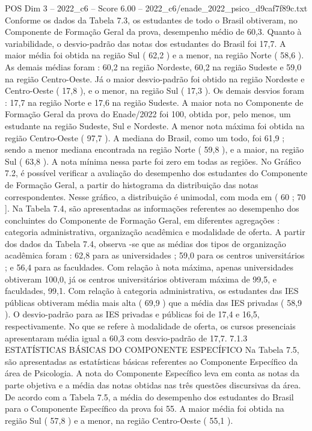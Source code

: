 \begin{textsample}{POS Dim 3 – 2022\_c6 – Score 6.00 – 2022\_c6/enade\_2022\_psico\_d9caf7f89c.txt}
Conforme os dados da Tabela 7.3, os estudantes de todo o Brasil obtiveram, no Componente de Formação Geral da prova, desempenho médio de 60,3.
Quanto à variabilidade, o desvio-padrão das notas dos estudantes do Brasil foi 17,7.
A maior média foi obtida na região Sul ( 62,2 ) e a menor, na região Norte ( 58,6 ).
As demais médias foram : 60,2 na região Nordeste, 60,2 na região Sudeste e 59,0 na região Centro-Oeste.
Já o maior desvio-padrão foi obtido na região Nordeste e Centro-Oeste ( 17,8 ), e o menor, na região Sul ( 17,3 ).
Os demais desvios foram : 17,7 na região Norte e 17,6 na região Sudeste.
A maior nota no Componente de Formação Geral da prova do Enade/2022 foi 100, obtida por, pelo menos, um estudante na região Sudeste, Sul e Nordeste.
A menor nota máxima foi obtida na região Centro-Oeste ( 97,7 ).
A mediana do Brasil, como um todo, foi 61,9 ; sendo a menor mediana encontrada na região Norte ( 59,8 ), e a maior, na região Sul ( 63,8 ).
A nota mínima nessa parte foi zero em todas as regiões.
No Gráfico 7.2, é possível verificar a avaliação do desempenho dos estudantes do Componente de Formação Geral, a partir do histograma da distribuição das notas correspondentes.
Nesse gráfico, a distribuição é unimodal, com moda em ( 60 ; 70 ].
Na Tabela 7.4, são apresentadas as informações referentes ao desempenho dos concluintes do Componente de Formação Geral, em diferentes agregações : categoria administrativa, organização acadêmica e modalidade de oferta.
A partir dos dados da Tabela 7.4, observa -se que as médias dos tipos de organização acadêmica foram : 62,8 para as universidades ; 59,0 para os centros universitários ; e 56,4 para as faculdades.
Com relação à nota máxima, apenas universidades obtiveram 100,0, já os centros universitários obtiveram máxima de 99,5, e faculdades, 99,1.
Com relação à categoria administrativa, os estudantes das IES públicas obtiveram média mais alta ( 69,9 ) que a média das IES privadas ( 58,9 ).
O desvio-padrão para as IES privadas e públicas foi de 17,4 e 16,5, respectivamente.
No que se refere à modalidade de oferta, os cursos presenciais apresentaram média igual a 60,3 com desvio-padrão de 17,7. 7.1.3 ESTATÍSTICAS BÁSICAS DO COMPONENTE ESPECÍFICO Na Tabela 7.5, são apresentadas as estatísticas básicas referentes ao Componente Específico da área de Psicologia.
A nota do Componente Específico leva em conta as notas da parte objetiva e a média das notas obtidas nas três questões discursivas da área.
De acordo com a Tabela 7.5, a média do desempenho dos estudantes do Brasil para o Componente Específico da prova foi 55.
A maior média foi obtida na região Sul ( 57,8 ) e a menor, na região Centro-Oeste ( 55,1 ).

\end{textsample}

